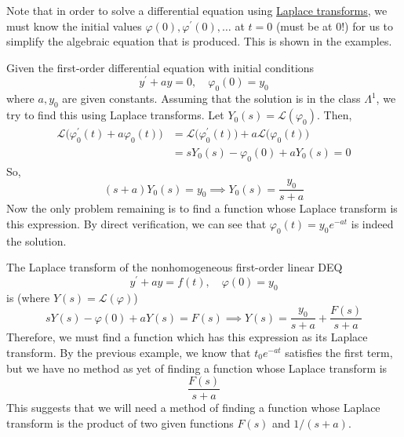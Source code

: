 \documentclass{article}
\newcounter{example}[section]
\begin{document}
      Note that in order to solve a differential equation using \hyperref[def:laplace-transform]{Laplace transforms}, we must know the initial values $\varphi(0), \varphi^\prime (0), \ldots$ at $t = 0$ (must be at $0$!) for us to simplify the algebraic equation that is produced. This is shown in the examples. 

      \begin{example}
        \label{ex:solving-a-first-order-equation-by-laplace}
      Given the first-order differential equation with initial conditions
      \begin{equation}
        y^\prime + a y = 0, \quad \varphi_0 (0) = y_0
      \end{equation}
      where $a, y_0$ are given constants. Assuming that the solution is in the class $\Lambda^1$, we try to find this using Laplace transforms. Let $Y_0 (s) = \mathcal{L}( \varphi_0)$. Then,
      \begin{align*}
          \mathcal{L}\big(\varphi_0^\prime (t) + a \varphi_0 (t)\big) & = \mathcal{L}\big(\varphi_0^\prime (t)\big) + a \mathcal{L}\big(\varphi_0 (t)\big) \\
          & = s Y_0 (s) - \varphi_0 (0) + a Y_0 (s) = 0
      \end{align*}
      So, 
      \begin{equation}
        (s+a) Y_0 (s) = y_0 \implies Y_0 (s) = \frac{y_0}{s+a}
      \end{equation}
      Now the only problem remaining is to find a function whose Laplace transform is this expression. By direct verification, we can see that $\varphi_0 (t) = y_0 e^{-at}$ is indeed the solution. 
      \end{example}

      \begin{example}
        \label{ex:laplace-transform-of-a-nonhomogeneous-equation}
      The Laplace transform of the nonhomogeneous first-order linear DEQ 
      \begin{equation}
        y^\prime + a y= f(t), \quad \varphi(0) = y_0
      \end{equation}
      is (where $Y(s) = \mathcal{L}(\varphi)$)
      \begin{equation}
        s Y(s) - \varphi(0) + a Y(s) = F(s) \implies Y(s) = \frac{y_0}{s+a} + \frac{F(s)}{s+a}
      \end{equation}
      Therefore, we must find a function which has this expression as its Laplace transform. By the previous example, we know that $t_0 e^{-at}$ satisfies the first term, but we have no method as yet of finding a function whose Laplace transform is 
      \begin{equation}
        \frac{F(s)}{s+a}
      \end{equation}
      This suggests that we will need a method of finding a function whose Laplace transform is the product of two given functions $F(s)$ and $1/(s+a)$. 
      \end{example}
\end{document}
